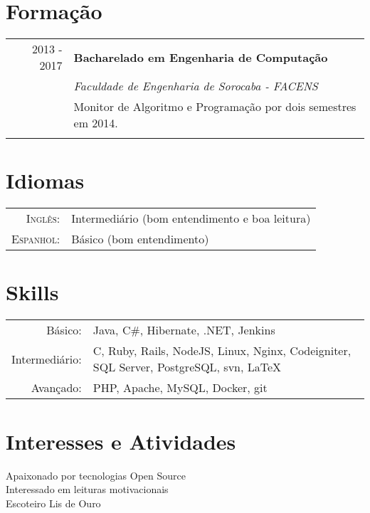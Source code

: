 \documentclass[a4paper,10pt]{article}
\begin{document}
\section{Formação}
\begin{tabular}{rl}	
 2013 - 2017 & \textbf{Bacharelado em Engenharia de Computação} \\
& \textit{Faculdade de Engenharia de Sorocaba - FACENS} \\
& Monitor de Algoritmo e Programação por dois semestres em 2014.\\&\\
\end{tabular}

\section{Idiomas}
\begin{tabular}{rl}
\textsc{Inglês:}&Intermediário (bom entendimento e boa leitura)\\
\textsc{Espanhol:}&Básico (bom entendimento)\\
\end{tabular}

\section{Skills}
\begin{tabular}{rl}
 Básico:& Java, C\#, Hibernate, .NET, Jenkins \setmainfont[SmallCapsFont=Fontin-SmallCaps.otf]{Fontin.otf}\\
 Intermediário:& C, Ruby, Rails, NodeJS, Linux, Nginx, Codeigniter, SQL Server, PostgreSQL, svn, \LaTeX \\
 Avançado:& PHP, Apache, MySQL, Docker, git
\end{tabular}

\section{Interesses e Atividades}
Apaixonado por tecnologias Open Source\\
Interessado em leituras motivacionais \\
Escoteiro Lis de Ouro \\
\end{document}
